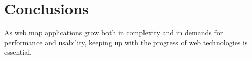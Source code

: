 \section{Conclusions}

As web map applications grow both in complexity and in demands for performance and usability,
keeping up with the progress of web technologies is essential.
